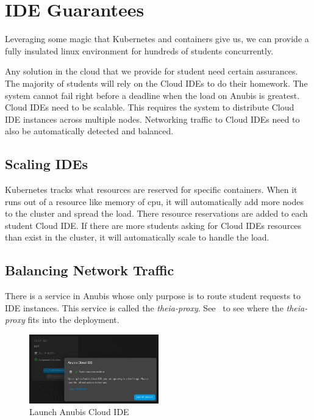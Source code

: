 \section{IDE Guarantees}\label{sec:ide-garantees}

Leveraging some magic that Kubernetes and containers give us,
we can provide a fully insulated linux environment for hundreds of
students concurrently.

Any solution in the cloud that we provide for student need certain assurances.
The majority of students will rely on the Cloud IDEs to do their homework.
The system cannot fail right before a deadline when the load on Anubis is greatest.
Cloud IDEs need to be scalable.
This requires the system to distribute Cloud IDE instances across multiple nodes. 
Networking traffic to Cloud IDEs need to also be automatically detected and balanced.

\subsection{Scaling IDEs}\label{subsec:scaling-ides}

Kubernetes tracks what resources are reserved for specific containers.
When it runs out of a resource like memory of cpu, it will automatically
add more nodes to the cluster and spread the load.
There resource reservations are added to each student Cloud IDE.
If there are more students asking for Cloud IDEs resources than exist
in the cluster, it will automatically scale to handle the load.

\subsection{Balancing Network Traffic}\label{subsec:balancing-network-traffic}

There is a service in Anubis whose only purpose is to route
student requests to IDE instances. 
This service is called the \textit{theia-proxy}. 
See~ to see where the \textit{theia-proxy}
fits into the deployment.

\begin{figure}
    \centering
    \includegraphics[width=0.5\textwidth]{figures/theia1.png}
    \caption{Launch Anubis Cloud IDE\label{fig:theia1}}
\end{figure}

